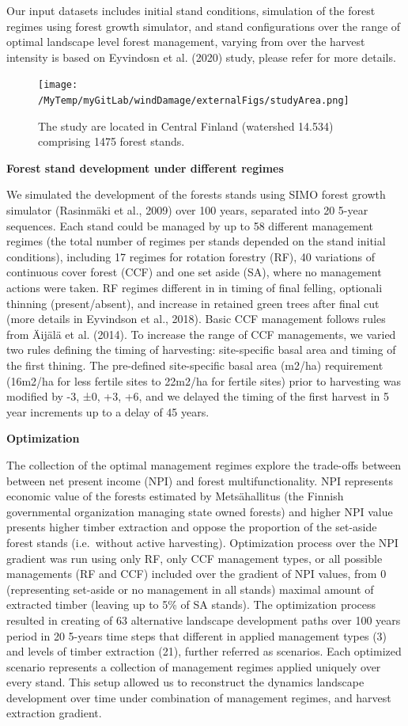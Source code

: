 \documentclass[]{elsarticle} %
\begin{document}
Our input datasets includes initial stand conditions, simulation of the
forest regimes using forest growth simulator, and stand configurations
over the range of optimal landscape level forest management, varying
from over the harvest intensity is based on Eyvindosn et al. (2020)
study, please refer for more details.

\begin{figure}
\centering
\texttt{[image: /MyTemp/myGitLab/windDamage/externalFigs/studyArea.png]}
\caption{The study are located in Central Finland (watershed 14.534)
comprising 1475 forest stands.}
\end{figure}

\textbf{Forest stand development under different regimes}

We simulated the development of the forests stands using SIMO forest
growth simulator (Rasinmäki et al., 2009) over 100 years, separated into
20 5-year sequences. Each stand could be managed by up to 58 different
management regimes (the total number of regimes per stands depended on
the stand initial conditions), including 17 regimes for rotation
forestry (RF), 40 variations of continuous cover forest (CCF) and one
set aside (SA), where no management actions were taken. RF regimes
different in in timing of final felling, optionali thinning
(present/absent), and increase in retained green trees after final cut
(more details in Eyvindson et al., 2018). Basic CCF management follows
rules from Äijälä et al. (2014). To increase the range of CCF
managements, we varied two rules defining the timing of harvesting:
site-specific basal area and timing of the first thining. The
pre-defined site-specific basal area (m2/ha) requirement (16m2/ha for
less fertile sites to 22m2/ha for fertile sites) prior to harvesting was
modified by -3, ±0, +3, +6, and we delayed the timing of the first
harvest in 5 year increments up to a delay of 45 years.

\textbf{Optimization}

The collection of the optimal management regimes explore the trade-offs
between between net present income (NPI) and forest multifunctionality.
NPI represents economic value of the forests estimated by Metsähallitus
(the Finnish governmental organization managing state owned forests) and
higher NPI value presents higher timber extraction and oppose the
proportion of the set-aside forest stands (i.e.~without active
harvesting). Optimization process over the NPI gradient was run using
only RF, only CCF management types, or all possible managements (RF and
CCF) included over the gradient of NPI values, from 0 (representing
set-aside or no management in all stands) maximal amount of extracted
timber (leaving up to 5\% of SA stands). The optimization process
resulted in creating of 63 alternative landscape development paths over
100 years period in 20 5-years time steps that different in applied
management types (3) and levels of timber extraction (21), further
referred as scenarios. Each optimized scenario represents a collection
of management regimes applied uniquely over every stand. This setup
allowed us to reconstruct the dynamics landscape development over time
under combination of management regimes, and harvest extraction
gradient.
\end{document}

